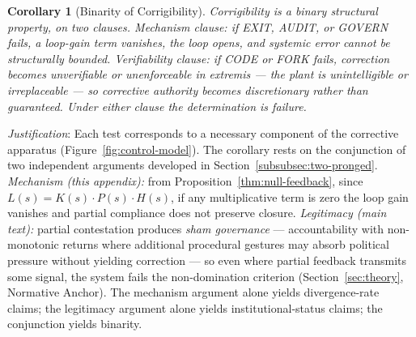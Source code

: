 \documentclass{article}
\newtheorem{corollary}{Corollary}[section]
\begin{document}
\begin{corollary}[Binarity of Corrigibility]
Corrigibility is a binary structural property, on two clauses. \textit{Mechanism clause}: if EXIT, AUDIT, or GOVERN fails, a loop-gain term vanishes, the loop opens, and systemic error cannot be structurally bounded. \textit{Verifiability clause}: if CODE or FORK fails, correction becomes unverifiable or unenforceable in extremis --- the plant is unintelligible or irreplaceable --- so corrective authority becomes discretionary rather than guaranteed. Under either clause the determination is failure.
\end{corollary}

\textit{Justification}: Each test corresponds to a necessary component of the corrective apparatus (Figure~\ref{fig:control-model}). The corollary rests on the conjunction of two independent arguments developed in Section~\ref{subsubsec:two-pronged}. \textit{Mechanism (this appendix):} from Proposition~\ref{thm:null-feedback}, since $L(s) = K(s) \cdot P(s) \cdot H(s)$, if any multiplicative term is zero the loop gain vanishes and partial compliance does not preserve closure. \textit{Legitimacy (main text):} partial contestation produces \textit{sham governance} --- accountability with non-monotonic returns where additional procedural gestures may absorb political pressure without yielding correction --- so even where partial feedback transmits some signal, the system fails the non-domination criterion (Section~\ref{sec:theory}, Normative Anchor). The mechanism argument alone yields divergence-rate claims; the legitimacy argument alone yields institutional-status claims; the conjunction yields binarity.
\end{document}
